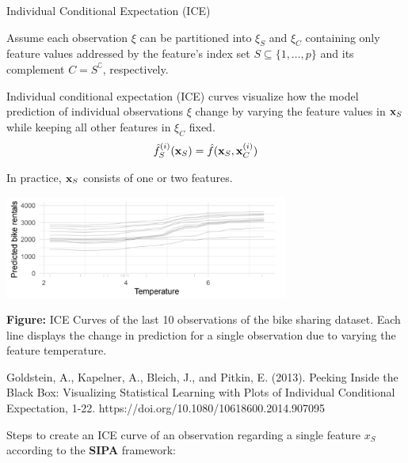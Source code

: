 \documentclass[11pt,compress,t,notes=noshow, xcolor=table]{beamer}
\begin{document}
\begin{vbframe}{Individual Conditional Expectation (ICE)}

Assume each observation $\xi$ can be partitioned into $\xi_S$ and $\xi_C$ containing only feature values addressed by the feature's index set $S \subseteq \{1, \dots, p\}$ and its complement $C = S^\complement$, respectively.

\lz

Individual conditional expectation (ICE) curves visualize how the model prediction of individual observations $\xi$
change by varying the feature values in $\xv_S$ while keeping all other features in $\xi_C$ fixed.
$$\fh_{S}^{(i)}(\xv_S) = \fh(\xv_S, \xi_C)$$

\framebreak

In practice, $\xv_S$ consists of one or two features.

\vspace{-0.2cm}
\begin{center}
\includegraphics[width=0.7\textwidth]{figure_man/ICE01.png}
\end{center}
\vspace{-0.3cm}
\scriptsize{\textbf{Figure:} ICE Curves of the last 10 observations of the bike sharing dataset. Each line displays the change in prediction for a single observation due to varying the feature temperature.\par}

\vspace{0.3cm}
\tiny{Goldstein, A., Kapelner, A., Bleich, J., and Pitkin, E. (2013). Peeking Inside the Black Box: Visualizing Statistical Learning with Plots of Individual Conditional Expectation, 1-22. https://doi.org/10.1080/10618600.2014.907095 \par}
\normalsize

\framebreak

Steps to create an ICE curve of an observation regarding a single feature $x_S$ according to the \textbf{SIPA} framework:


\end{vbframe}
\end{document}
